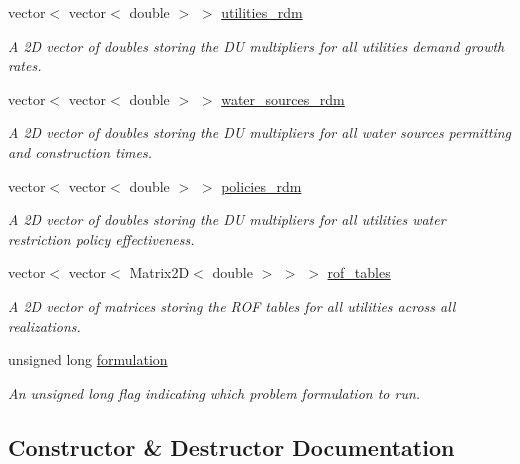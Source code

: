 \begin{DoxyCompactItemize}
vector$<$ vector$<$ double $>$ $>$ \mbox{\hyperlink{classProblem_aa4f6db22580c8d8a941e83556f4f5208}{utilities\+\_\+rdm}}
\begin{DoxyCompactList}\small\item\em A 2D vector of doubles storing the DU multipliers for all utilities\textquotesingle{} demand growth rates. \end{DoxyCompactList}\item 
vector$<$ vector$<$ double $>$ $>$ \mbox{\hyperlink{classProblem_ace43e5306285f0d91a199a4bd5a38922}{water\+\_\+sources\+\_\+rdm}}
\begin{DoxyCompactList}\small\item\em A 2D vector of doubles storing the DU multipliers for all water sources\textquotesingle{} permitting and construction times. \end{DoxyCompactList}\item 
vector$<$ vector$<$ double $>$ $>$ \mbox{\hyperlink{classProblem_a63d49161a5d6d98e26cd218d90a13bae}{policies\+\_\+rdm}}
\begin{DoxyCompactList}\small\item\em A 2D vector of doubles storing the DU multipliers for all utilities\textquotesingle{} water restriction policy effectiveness. \end{DoxyCompactList}\item 
vector$<$ vector$<$ Matrix2D$<$ double $>$ $>$ $>$ \mbox{\hyperlink{classProblem_a0a64a8c04964a326879eccccf5437c93}{rof\+\_\+tables}}
\begin{DoxyCompactList}\small\item\em A 2D vector of matrices storing the R\+OF tables for all utilities across all realizations. \end{DoxyCompactList}\item 
unsigned long \mbox{\hyperlink{classProblem_a3c013ea45ae840c261341bf31eaec87b}{formulation}}
\begin{DoxyCompactList}\small\item\em An unsigned long flag indicating which problem formulation to run. \end{DoxyCompactList}\end{DoxyCompactItemize}


\subsection{Constructor \& Destructor Documentation}
\mbox{\label{classProblem_a41939e01b382197124fcd9f5e8c7520d}} 
